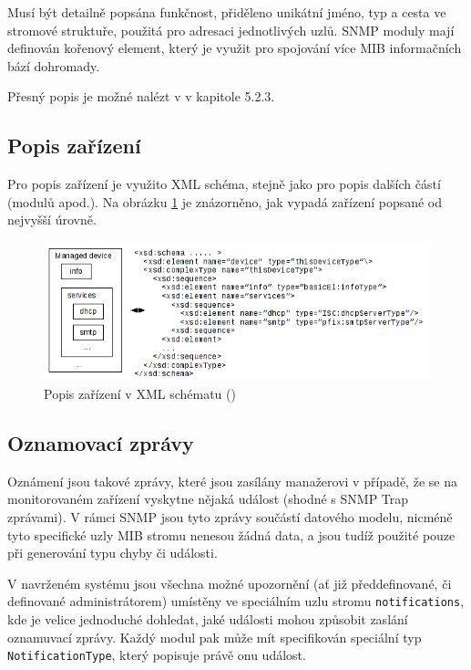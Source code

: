 Musí být detailně popsána funkčnost, přiděleno unikátní jméno, typ a cesta ve stromové struktuře, použitá pro adresaci jednotlivých uzlů. 
SNMP moduly mají definován kořenový element, který je využit pro spojování více MIB informačních bází dohromady.

Přesný popis je možné nalézt v \cite{macejko_dipl} v kapitole 5.2.3.

\subsection{Popis zařízení}
Pro popis zařízení je využito XML schéma, stejně jako pro popis dalších částí (modulů apod.). Na obrázku \ref{obr_xml_popis_zarizeni} je znázorněno,
jak vypadá zařízení popsané od nejvyšší úrovně. 

\begin{figure}[htp]
	\begin{center}
		\includegraphics[width=15cm]{obrazky/03_popis_zarizeni.png}
		\caption{Popis zařízení v XML schématu (\cite{macejko_dipl})}
		\label{obr_xml_popis_zarizeni}
	\end{center}
\end{figure}

\subsection{Oznamovací zprávy}
Oznámení jsou takové zprávy, které jsou zasílány manažerovi v případě, že se na monitorovaném zařízení vyskytne nějaká událost (shodné s SNMP Trap zprávami).
V rámci SNMP jsou tyto zprávy součástí datového modelu, nicméně tyto specifické uzly MIB stromu nenesou žádná data, a jsou tudíž použité pouze při generování typu
chyby či události. 

V navrženém systému jsou všechna možné upozornění (ať již předdefinované, či definované administrátorem) umístěny ve speciálním uzlu stromu \verb|notifications|, 
kde je velice jednoduché dohledat, jaké události mohou způsobit zaslání oznamuvací zprávy. Každý modul pak může mít specifikován speciální typ \verb|NotificationType|,
který popisuje právě onu událost.


